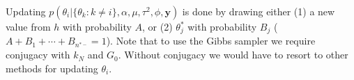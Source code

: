 \documentclass[12pt]{article}
\newcommand{\m}[1]{\mathbf{\bm{#1}}}
\begin{document}
\noindent Updating $p(\theta_i|\{\theta_k:k\neq i\},\alpha,\mu,\tau^2,\phi,\m{y})$ is done by drawing either (1) a new value from $h$ with probability $A$, or (2) $\theta_j^*$ with probability $B_j$ ($A+B_1+\cdots+B_{n^{*-}}=1$). Note that to use the Gibbs sampler we require conjugacy with $k_N$ and $G_0$. Without conjugacy we would have to resort to other methods for updating $\theta_i$.
\end{document}
